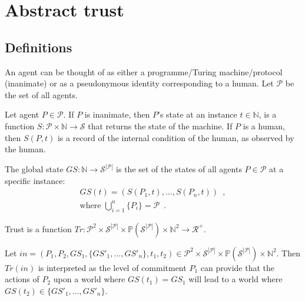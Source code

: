 \section{Abstract trust}
  \subsection{Definitions}
    \begin{definition}[Agent]
       An agent can be thought of as either a programme/Turing machine/protocol (inanimate) or as a pseudonymous identity
       corresponding to a human. Let $\mathcal{P}$ be the set of all agents.
    \end{definition}
    \begin{definition}[State]
      Let agent $P \in \mathcal{P}$. If $P$ is inanimate, then $P$'s state at an instance $t \in \mathbb{N}$, is a function $S :
      \mathcal{P} \times \mathbb{N} \rightarrow \mathcal{S}$ that returns the state of the machine. If $P$ is a human, then
      $S\left(P, t\right)$ is a record of the internal condition of the human, as observed by the human.
    \end{definition}
    \begin{definition}
      The global state $GS : \mathbb{N} \rightarrow \mathcal{S}^{|\mathcal{P}|}$ is the set of the states of all agents $P \in
      \mathcal{P}$ at a specific instance: 
      \begin{gather*}
        GS\left(t\right) = \left(S\left(P_1, t\right), ...,S\left(P_n, t\right)\right) \enspace, \\
        \mbox{where } \bigcup\limits_{i = 1}^n\{P_i\} = \mathcal{P} \enspace.
      \end{gather*}
    \end{definition}
    \begin{definition}[Trust]
      Trust is a function $Tr : \mathcal{P}^2 \times \mathcal{S}^{|\mathcal{P}|} \times
      \mathbb{P}\left(\mathcal{S}^{|\mathcal{P}|}\right) \times \mathbb{N}^2 \rightarrow \mathcal{R}^{+}$.
    \end{definition}
    \noindent Let $in = \left(P_1, P_2, GS_1, \{GS'_1, ...,GS'_n\}, t_1, t_2\right) \in \mathcal{P}^2 \times
    \mathcal{S}^{|\mathcal{P}|} \times \mathbb{P}\left(\mathcal{S}^{|\mathcal{P}|}\right) \times \mathbb{N}^2$. Then
    $Tr\left(in\right)$ is interpreted as the level of commitment $P_1$ can provide that the actions of $P_2$ upon a world where
    $GS\left(t_1\right) = GS_1$ will lead to a world where $GS\left(t_2\right) \in \{GS'_1, ...,GS'_n\}$.

